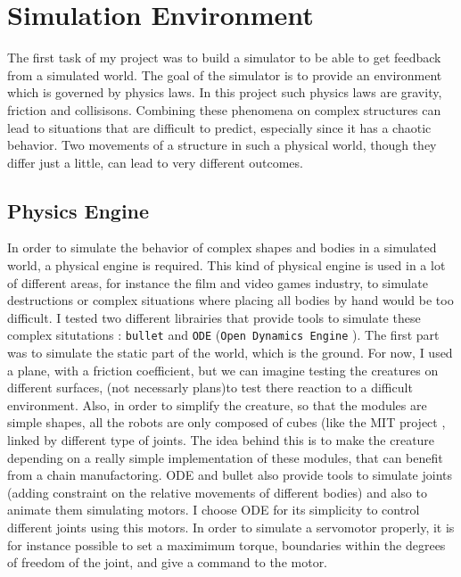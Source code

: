 
\chapter{Simulation Environment} %

\label{Chapter 2} %


The first task of my project was to build a simulator to be able to get feedback from a simulated world. The goal of the simulator is to provide an environment which is governed by physics laws. In this project such physics laws are gravity, friction and collisisons. Combining these phenomena on complex structures can lead to situations that are difficult to predict, especially since it has a chaotic behavior. Two movements of a structure in such a physical world, though they differ just a little, can lead to very different outcomes.  

\section{Physics Engine}

In order to simulate the behavior of complex shapes and bodies in a simulated world, a physical engine is required. This kind of physical engine is used in a lot of different areas, for instance the film and video games industry, to simulate destructions or complex situations where placing all bodies by hand would be too difficult. I tested two different librairies that provide tools to simulate these complex situtations : \verb?bullet? and \verb?ODE? (\verb?Open Dynamics Engine? \cite{ode}). The first part was to simulate the static part of the world, which is the ground. For now, I used a plane, with a friction coefficient, but we can imagine testing the creatures on different surfaces, (not necessarly plans)to test there reaction to a difficult environment. Also, in order to simplify the creature, so that the modules are simple shapes, all the robots are only composed of cubes (like the MIT project \cite{mitcubes}, linked by different type of joints. The idea behind this is to make the creature depending on a really simple implementation of these modules, that can benefit from a chain manufactoring. ODE and bullet also provide tools to simulate joints (adding constraint on the relative movements of different bodies) and also to animate them simulating motors. I choose ODE for its simplicity to control different joints using this motors. In order to simulate a servomotor properly, it is for instance possible to set a maximimum torque, boundaries within the degrees of freedom of the joint, and give a command to the motor.
 
